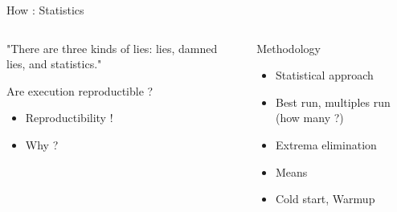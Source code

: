 %
\begin{Frame}{How : Statistics}
  \begin{columns}[t]
    \begin{column}{5cm} %
      \begin{alertblock}{}
"There are three kinds of lies: lies, damned lies, and statistics."        
      \end{alertblock}
      \begin{block}{Are execution reproductible ?}
        \begin{itemize}
        \item Reproductibility !
        \item Why ?
        \end{itemize}
      \end{block} 
    \end{column}
    
    \begin{column}{5cm} %
      \begin{block}{Methodology}
        \begin{itemize}
        \item Statistical approach
        \item Best run, multiples run (how many ?)
        \item Extrema elimination
        \item Means
        \item Cold start, Warmup
        \end{itemize}
      \end{block}   
    \end{column}
  \end{columns}  
\end{Frame}


